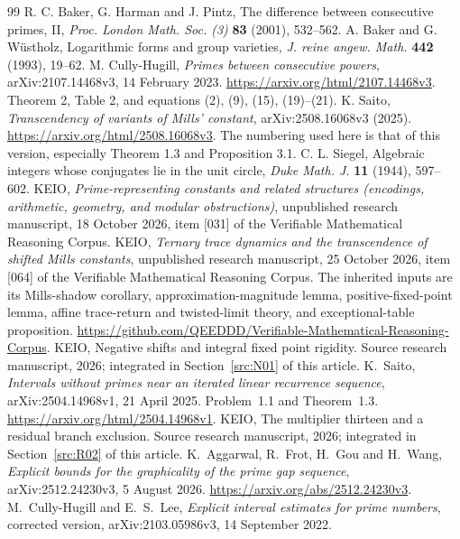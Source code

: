 \documentclass[11pt,a4paper]{article}
\theoremstyle{definition}\newtheorem{definition}[theorem]{Definition}
\theoremstyle{remark}\newtheorem{remark}[theorem]{Remark}
\begin{document}
\begin{thebibliography}{99}
R. C. Baker, G. Harman and J. Pintz,
The difference between consecutive primes, II,
\emph{Proc. London Math. Soc. (3)} \textbf{83} (2001), 532--562.
A. Baker and G. W\"ustholz,
Logarithmic forms and group varieties,
\emph{J. reine angew. Math.} \textbf{442} (1993), 19--62.
M. Cully-Hugill,
\emph{Primes between consecutive powers},
arXiv:2107.14468v3, 14 February 2023.
\url{https://arxiv.org/html/2107.14468v3}.
Theorem 2, Table 2, and equations (2), (9), (15), (19)--(21).
K. Saito,
\emph{Transcendency of variants of Mills' constant},
arXiv:2508.16068v3 (2025).
\url{https://arxiv.org/html/2508.16068v3}.
The numbering used here is that of this version, especially
Theorem 1.3 and Proposition 3.1.
C. L. Siegel,
Algebraic integers whose conjugates lie in the unit circle,
\emph{Duke Math. J.} \textbf{11} (1944), 597--602.
KEIO,
\emph{Prime-representing constants and related structures
  (encodings, arithmetic, geometry, and modular obstructions)},
unpublished research manuscript, 18 October 2026,
item [031] of the Verifiable Mathematical Reasoning Corpus.
KEIO,
\emph{Ternary trace dynamics and the transcendence of shifted Mills
constants}, unpublished research manuscript, 25 October 2026,
item [064] of the Verifiable Mathematical Reasoning Corpus.
The inherited inputs are its Mills-shadow corollary, approximation-magnitude
lemma, positive-fixed-point lemma, affine trace-return and twisted-limit
theory, and exceptional-table proposition.
\url{https://github.com/QEEDDD/Verifiable-Mathematical-Reasoning-Corpus}.
KEIO, Negative shifts and integral fixed point rigidity. Source research manuscript, 2026; integrated in Section~\ref{src:N01} of this article.
K.~Saito, \emph{Intervals without primes near an iterated linear
recurrence sequence}, arXiv:2504.14968v1, 21 April 2025.
Problem~1.1 and Theorem~1.3.
\url{https://arxiv.org/html/2504.14968v1}.
KEIO, The multiplier thirteen and a residual branch exclusion. Source research manuscript, 2026; integrated in Section~\ref{src:R02} of this article.
K.~Aggarwal, R.~Frot, H.~Gou and H.~Wang,
\emph{Explicit bounds for the graphicality of the prime gap sequence},
arXiv:2512.24230v3, 5 August 2026.
\url{https://arxiv.org/abs/2512.24230v3}.
M.~Cully-Hugill and E.~S.~Lee,
\emph{Explicit interval estimates for prime numbers},
corrected version, arXiv:2103.05986v3, 14 September 2022.

\end{thebibliography}
\end{document}
